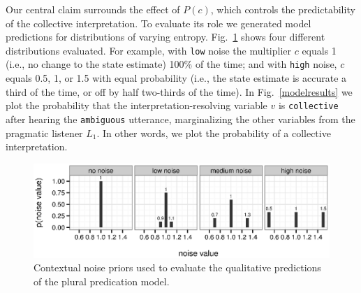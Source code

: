 \documentclass[linguex]{sp}
\begin{document}
Our central claim surrounds the effect of $P(c)$, which controls the predictability of the collective interpretation. To evaluate its role we generated model predictions for distributions of varying entropy.
%
%
Fig.~\ref{noises} shows four different distributions evaluated. For example, with \texttt{low} noise the multiplier $c$ equals 1 (i.e., no change to the state estimate) 100\% of the time; and with \texttt{high} noise, $c$ equals 0.5, 1, or 1.5 with equal probability (i.e., the state estimate is accurate a third of the time, or off by half two-thirds of the time).
In Fig.~\ref{modelresults} we plot the probability that the interpretation-resolving variable $v$ is \texttt{collective} after hearing the \texttt{ambiguous} utterance, marginalizing the other variables from the pragmatic listener $L_1$. In other words, we plot the probability of a collective interpretation.%

\begin{figure}[h]
	\centering
	\includegraphics[width=\linewidth]{plots/noise_plots.eps}
	\vspace{-20pt}
	\caption{Contextual noise priors used to evaluate the qualitative predictions of the plural predication model.} \label{noises}
\end{figure}
\end{document}
